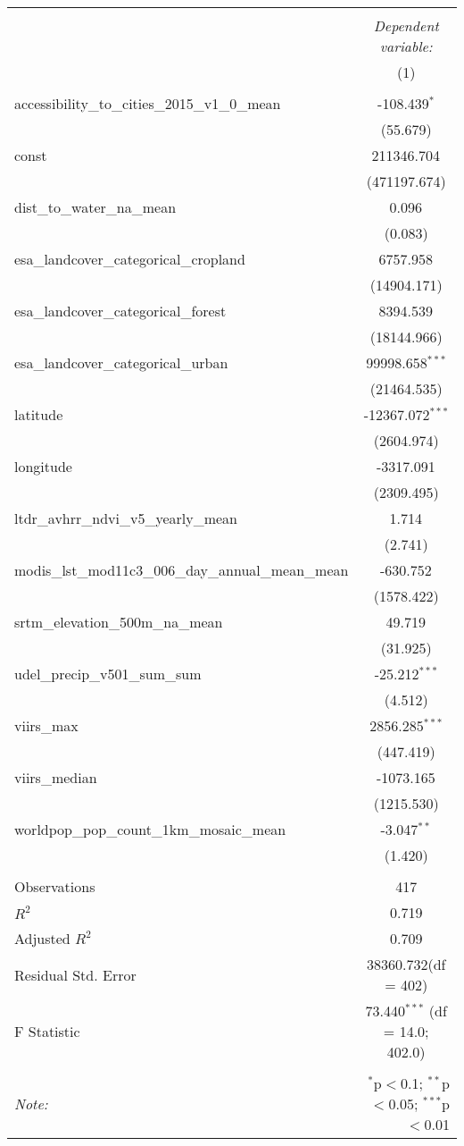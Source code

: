 \begin{table}[!htbp] \centering
\begin{tabular}{@{\extracolsep{5pt}}lc}
\\[-1.8ex]\hline
\hline \\[-1.8ex]
& \multicolumn{1}{c}{\textit{Dependent variable:}} \
\cr \cline{1-2}
\\[-1.8ex] & (1) \\
\hline \\[-1.8ex]
 accessibility_to_cities_2015_v1_0_mean & -108.439$^{*}$ \\
  & (55.679) \\
 const & 211346.704$^{}$ \\
  & (471197.674) \\
 dist_to_water_na_mean & 0.096$^{}$ \\
  & (0.083) \\
 esa_landcover_categorical_cropland & 6757.958$^{}$ \\
  & (14904.171) \\
 esa_landcover_categorical_forest & 8394.539$^{}$ \\
  & (18144.966) \\
 esa_landcover_categorical_urban & 99998.658$^{***}$ \\
  & (21464.535) \\
 latitude & -12367.072$^{***}$ \\
  & (2604.974) \\
 longitude & -3317.091$^{}$ \\
  & (2309.495) \\
 ltdr_avhrr_ndvi_v5_yearly_mean & 1.714$^{}$ \\
  & (2.741) \\
 modis_lst_mod11c3_006_day_annual_mean_mean & -630.752$^{}$ \\
  & (1578.422) \\
 srtm_elevation_500m_na_mean & 49.719$^{}$ \\
  & (31.925) \\
 udel_precip_v501_sum_sum & -25.212$^{***}$ \\
  & (4.512) \\
 viirs_max & 2856.285$^{***}$ \\
  & (447.419) \\
 viirs_median & -1073.165$^{}$ \\
  & (1215.530) \\
 worldpop_pop_count_1km_mosaic_mean & -3.047$^{**}$ \\
  & (1.420) \\
\hline \\[-1.8ex]
 Observations & 417 \\
 $R^2$ & 0.719 \\
 Adjusted $R^2$ & 0.709 \\
 Residual Std. Error & 38360.732(df = 402)  \\
 F Statistic & 73.440$^{***}$ (df = 14.0; 402.0) \\
\hline
\hline \\[-1.8ex]
\textit{Note:} & \multicolumn{1}{r}{$^{*}$p$<$0.1; $^{**}$p$<$0.05; $^{***}$p$<$0.01} \\
\end{tabular}
\end{table}